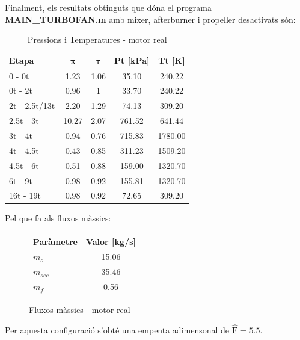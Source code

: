 Finalment, els resultats obtinguts que dóna el programa \textbf{MAIN\_TURBOFAN.m} amb mixer, afterburner i propeller desactivats són:
\begin{table}[H]
\centering
\begin{tabular}{lcccc}
\toprule[3pt]
\textbf{Etapa} &\textbf{$\bm{\pi}$} & \textbf{$\bm{\tau}$}    & \textbf{Pt} [kPa]  & \textbf{Tt} [K]  \\
\midrule[1pt]
0 - 0t     & 1.23   & 1.06  & 35.10   & 240.22             \\
0t - 2t     & 0.96   & 1  & 33.70   & 240.22             \\
2t - 2.5t/13t     & 2.20   & 1.29  & 74.13   & 309.20             \\
2.5t - 3t     & 10.27  & 2.07  & 761.52   & 641.44             \\
3t - 4t     & 0.94     & 0.76  & 715.83  & 1780.00             \\
4t - 4.5t     & 0.43   & 0.85  & 311.23   & 1509.20             \\
4.5t - 6t     & 0.51   & 0.88  & 159.00   & 1320.70             \\
6t - 9t     & 0.98   & 0.92  & 155.81   & 1320.70            \\
16t - 19t     & 0.98   & 0.92  & 72.65   & 309.20            \\
\bottomrule[2pt]
\end{tabular}
\caption{Pressions i Temperatures - motor real}
\end{table}
Pel que fa als fluxos màssics:
\begin{figure}[H]
	\centering
	\begin{tabular}{lc}
		\toprule[3pt]
		\textbf{Paràmetre}&\textbf{Valor [kg/s]}\\
		\midrule[1pt]
		$m_{o}$ & 15.06 \\
		$m_{sec}$ & 35.46 \\
		$m_{f}$ & 0.56 \\
		\bottomrule[2pt]
	\end{tabular}
	\label{C_opti2}
	\caption{Fluxos màssics - motor real}
\end{figure}
Per aquesta configuració s'obté una empenta adimensonal de $\bm{\hat{F} = 5.5}$.